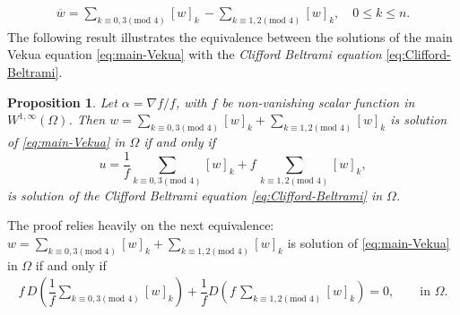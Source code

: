\documentclass[12pt]{article}
\newtheorem{proposition}[theorem]{Proposition}
\newtheorem{remark}[theorem]{Remark}
\def\div{\mbox{div}\,}
\begin{document}
\begin{align}\label{eq:conjugate}
\overline{w}=\sum_{k\equiv 0,3 (\text{mod } 4)} [w]_k\,-\sum_{k\equiv 1,2 (\text{mod } 4)} [w]_k, \quad 0\leq k\leq n.
\end{align}
The following result illustrates the equivalence between the solutions of the main Vekua equation \eqref{eq:main-Vekua} with the \textit{Clifford Beltrami equation} \eqref{eq:Clifford-Beltrami}.
\begin{proposition}\cite[Prop.\ 2]{Delgado2023}\label{prop:Beltrami equivalence}
Let $\alpha=\nabla f/f$, with $f$ be non-vanishing scalar function in $ W^{1,\infty}(\Omega)$. Then $w=\sum_{k\equiv 0,3 (\text{mod } 4)} [w]_k+\sum_{k\equiv 1,2 (\text{mod } 4)} [w]_k$ is solution of \eqref{eq:main-Vekua} in $\Omega$ if and only if
\begin{equation}\label{eq:transformation-solution}
  u=\dfrac{1}{f}\sum_{k\equiv 0,3 (\text{mod } 4)} [w]_k+f\, \sum_{k\equiv 1,2 (\text{mod } 4)} [w]_k,
\end{equation}
is solution of the Clifford Beltrami equation \eqref{eq:Clifford-Beltrami} in $\Omega$.
\end{proposition}
The proof relies heavily on the next equivalence: $w=\sum_{k\equiv 0,3 (\text{mod } 4)} [w]_k+\sum_{k\equiv 1,2 (\text{mod } 4)} [w]_k$ is solution of \eqref{eq:main-Vekua} in $\Omega$ if and only if 
\begin{align}\label{eq:equivalence-Vekua}
 f\, D\left(\dfrac{1}{f} \sum_{k\equiv 0,3 (\text{mod } 4)} [w]_k \right)+\dfrac{1}{f} D\left(f\, \sum_{k\equiv 1,2 (\text{mod } 4)} [w]_k \right)=0,\qquad \text{in }\Omega.
\end{align}

\end{document}
